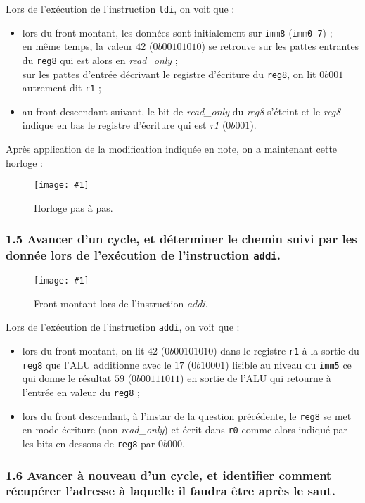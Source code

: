 \documentclass[twoside, 12pt, a4paper]{article}
\newcommand{\cf}[3]{
    \begin{figure}[!h]
        \centering
        \texttt{[image: \#1]}
    \caption{#3}\label{Fig:#1}
    \end{figure}
}
\newcommand{\hcf}[2]{\cf{#1}{.75}{#2}}
\newcommand{\qcf}[2]{\cf{#1}{.5}{#2}}
\begin{document}
Lors de l'exécution de l'instruction \texttt{ldi}, on voit que :
\begin{itemize}

    \item lors du front montant, les données sont initialement sur \texttt{imm8} (\texttt{imm0-7}) ; \\
en même temps, la valeur $42$ ($0b00101010$) se retrouve sur les pattes entrantes du \texttt{reg8} qui est alors en \textit{read\_only} ; \\
sur les pattes d'entrée décrivant le registre d'écriture du \texttt{reg8}, on lit $0b001$ autrement dit \texttt{r1} ;
    \item au front descendant suivant, le bit de \textit{read\_only} du \textit{reg8} s'éteint et le \textit{reg8} indique en bas le registre d'écriture qui est \textit{r1} ($0b001$).
    
\end{itemize}

Après application de la modification indiquée en note, on a maintenant cette horloge :
    \hcf{clock.png}{Horloge pas à pas.}

        \subsubsection*{\textbf{1.5} Avancer d'un cycle, et déterminer le chemin suivi par les donnée lors de l'exécution de l'instruction \texttt{addi}.}

\qcf{add.png}{Front montant lors de l'instruction \textit{addi}.}

Lors de l'exécution de l'instruction \texttt{addi}, on voit que :
\begin{itemize}
    \item lors du front montant, on lit $42$ ($0b00101010$) dans le registre \texttt{r1} à la sortie du \texttt{reg8} que l'ALU additionne avec le $17$ ($0b10001$) lisible au niveau du \texttt{imm5} ce qui donne le résultat $59$ ($0b00111011$) en sortie de l'ALU qui retourne à l'entrée en valeur du \texttt{reg8} ;
    \item lors du front descendant, à l'instar de la question précédente, le \texttt{reg8} se met en mode écriture (non \textit{read\_only}) et écrit dans \texttt{r0} comme alors indiqué par les bits en dessous de \texttt{reg8} par $0b000$.
\end{itemize}

        \subsubsection*{\textbf{1.6} Avancer à nouveau d'un cycle, et identifier comment récupérer l'adresse à laquelle il faudra être après le saut.}
\end{document}
